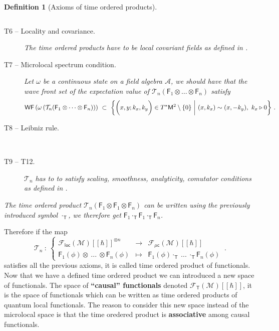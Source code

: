 \documentclass[11pt]{book}
\newcommand{\hilight}[1]{\colorbox{yellow!80!black}{#1}}
\newcommand{\WF}{\mathsf{WF}}
\newcommand{\loc}{\mathsf{loc}}
\newcommand{\muc}{\mu\csf}
\newcommand{\Acal}{\mathcal{A}}
\newcommand{\Fcal}{\mathcal{F}}
\newcommand{\Mcal}{\mathcal{M}}
\newcommand{\Tcal}{\mathcal{T}}
\newcommand{\Fsf}{\mathsf{F}}
\newcommand{\Msf}{\mathsf{M}}
\newcommand{\Tsf}{\mathsf{T}}
\newcommand{\csf}{\mathsf{c}}
\theoremstyle{break}
\newtheorem{definition}{Definition}[chapter]
\begin{document}
\begin{definition}[Axioms of time ordered products]
\begin{description}
\begin{equation*}
\end{equation*}
%
\item[T6 -- Locality and covariance.]\label{item:T6} The time ordered products have to be local covariant fields as defined in \cite{hollands_local_2001}.
%
\item[T7 -- Microlocal spectrum condition.]\label{item:T7} Let $\omega$ be a continuous state on a field algebra $\Acal$, we should have that the wave front set of the expectation value of $\Tcal_n(\Fsf_1\otimes\dots\otimes\Fsf_n)$ satisfy 
%
\begin{equation*}
\WF\left(\omega\left(\Tcal_n(\Fsf_1\otimes\dots\otimes\Fsf_n)\right)\right) \ \subset \ \bigg\{ \bigg( x, y ; k_x, k_y \bigg) \in T^\ast\Msf^2 \setminus \{0\} \ \bigg| \ (x,k_x) \sim (x,-k_y), \ k_x \triangleright 0 \bigg\} \ .
\vspace*{-10pt}
\end{equation*}
%
\item[\hilight{T8 -- Leibniz rule.}]\label{item:T8} \ 
%
\item[T9 -- T12.]\label{item:T9_T12} $\Tcal_n$ has to to satisfy scaling, smoothness, analyticity, comutator conditions as defined in \cite{hollands_local_2001}.
\end{description}
%
The time ordered product $\Tcal_n(\Fsf_1\otimes\Fsf_1\otimes\Fsf_n)$ can be written using the previously introduced symbol $\cdot_\Tsf$, we therefore get $\Fsf_1\cdot_\Tsf\Fsf_1\cdot_\Tsf\Fsf_n$. 
\end{definition}

Therefore if the map
%
\begin{equation*}
\Tcal_n \ : \ 
\left\{
\begin{array}{lcl}
\Fcal_{\loc}(\Mcal)[[\hbar]]^{\otimes n} & \to & \Fcal_{\muc}(\Mcal)[[\hbar]] \\
\Fsf_1(\phi) \otimes \ ... \ \otimes \Fsf_n(\phi) & \mapsto & \Fsf_1(\phi) \cdot_{\Tsf} \ ... \ \cdot_{\Tsf} \Fsf_n(\phi)
\end{array}
\right. \ .
\end{equation*}
%
satisfies all the previous axioms, it is called time ordered product of functionals. Now that we have a defined time ordered product we can introduced a new space of functionals.  The space of \textbf{``causal'' functionals} denoted $\Fcal_\Tsf(\Mcal)[[\hbar]]$\index{$\Fcal_\Tsf(\Mcal)$}, it is the space of functionals which can be written as time ordered products of quantum local functionals. The reason to consider this new space instead of the microlocal space is that the time oredered product is \textbf{associative} among causal functionals.
\end{document}
